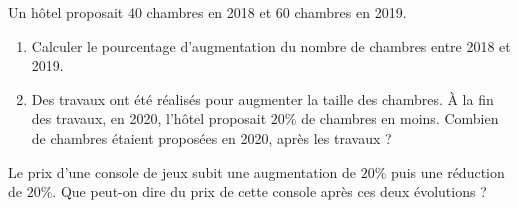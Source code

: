\documentclass[a4paper,dvipsnames]{article}
\begin{document}
\bigskip

\exo [3 points] Un hôtel proposait $40$ chambres en 2018 et $60$ chambres en 2019. 
\begin{enumerate}
  \item Calculer le pourcentage d'augmentation du nombre de chambres entre 2018 et 2019.
  \item Des travaux ont été réalisés pour augmenter la taille des chambres. À la fin des travaux, en 2020, l'hôtel proposait $20\%$ de chambres en moins. Combien de chambres étaient proposées en 2020, après les travaux ?
\end{enumerate}

\bigskip

\exo[2 points] Le prix d'une console de jeux subit une augmentation de $20\%$ puis une réduction de $20\%$. Que peut-on dire du prix de cette console après ces deux évolutions ?
\end{document}
